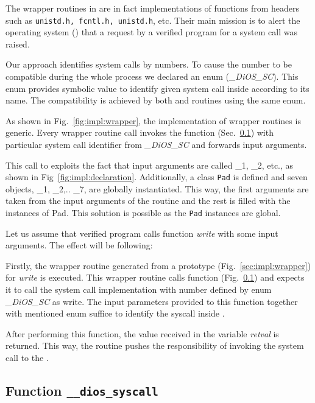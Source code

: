 The wrapper routines in \divine are in fact implementations of functions from headers such as \texttt{unistd.h, fcntl.h, unistd.h}, etc. Their main mission is to alert the operating system (\dios) that a request by a verified program for a system call was raised.

Our approach identifies system calls by numbers. To cause the number to be compatible during the whole process we declared an enum (\textit{\_DiOS\_SC}). This enum provides symbolic value to identify given system call inside \dios according to its name. The compatibility is achieved by both \dios and routines using the same enum.

As shown in Fig.~\ref{fig:impl:wrapper}, the implementation of wrapper routines is generic. Every wrapper routine call invokes the \dios function \diossyscall (Sec.~\ref{sec:diosSyscall}) with particular system call identifier from \textit{\_DiOS\_SC} and forwards input arguments.

This call to \diossyscall exploits the fact that input arguments are called \_1, \_2, etc., as shown in Fig~\ref{fig:impl:declaration}. Additionally, a class \texttt{Pad} is defined and seven objects, \_1, \_2,.. \_7, are globally instantiated. This way, the first arguments are taken from the input arguments of the routine and the rest is filled with the instances of Pad. This solution is possible as the \texttt{Pad} instances are global. 

Let us assume that verified program calls function \textit{write} with some input arguments. The effect will be following:

Firstly, the wrapper routine generated from a prototype (Fig.~\ref{sec:impl:wrapper}) for \textit{write} is executed. This wrapper routine calls \diossyscall function (Fig.~\ref{sec:diosSyscall}) and expects it to call the system call implementation with number defined by enum \textit{\_DiOS\_SC} as write. The input parameters provided to this function together with mentioned enum suffice to identify the syscall inside \dios. 

After performing this function, the value received in the variable \textit{retval} is returned. This way, the routine pushes the responsibility of invoking the system call to the \dios.

\subsection{ Function \texttt{\_\_dios\_syscall}} \label{sec:diosSyscall}

